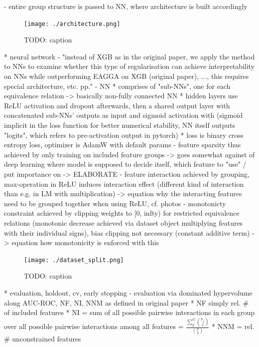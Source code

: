 \documentclass[twoside,11pt]{article}
\begin{document}
    - entire group structure is passed to NN, where architecture is built accordingly
\begin{figure}
  \centering
  \texttt{[image: ./architecture.png]}  %
  \caption{TODO: caption}
  \label{fig-nn-architecture}
\end{figure}
  * neural network
    - "instead of XGB as in the original paper, we apply the method to NNs to examine whether this type of regularisation can achieve interpretability on NNs while
      outperforming EAGGA on XGB (original paper), ..., this requires special architecture, etc. pp."
    - NN
      * comprises of "sub-NNs", one for each equivalence relation -> basically non-fully connected NN
      * hidden layers use ReLU activation and dropout afterwards, then a shared output layer with concatenated sub-NNs' outputs as input and sigmoid activation with
        (sigmoid implicit in the loss function for better numerical stability, NN itself outputs "logits", which refers to pre-activation output in pytorch)
      * loss is binary cross entropy loss, optimizer is AdamW with default params
    - feature sparsity thus achieved by only training on included feature groups -> goes somewhat against of deep learning where model is supposed to decide itself,
      which feature to "use" / put importance on -> ELABORATE
    - feature interaction achieved by grouping, max-operation in ReLU induces interaction effect (different kind of interaction than e.g. in LM with multiplication)
      -> equation why the interacting features need to be grouped together when using ReLU, cf. photos
    - monotonicty constraint achieved by clipping weights to [0, infty) for restricted equivalence relations (monotonic decrease achieved via dataset object multiplying
      features with their individual signs), bias clipping not necessary (constant additive term)
      -> equation how monotonicity is enforced with this
\begin{figure}
  \centering
  \texttt{[image: ./dataset\_split.png]}
  \caption{TODO: caption}
  \label{fig-dataset-split}
\end{figure}
  * evaluation, holdout, cv, early stopping
    - evaluation via dominated hypervolume along AUC-ROC, NF, NI, NNM as defined in original paper
      * NF simply rel. \# of included features
      * NI = sum of all possible pairwise interactions in each group over all possible pairwise interactions among all features = $\frac{\sum_g^G {p_g \choose 2}}{{p \choose 2}}$
      * NNM = rel. \# unconstrained features
\end{document}
